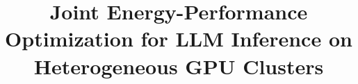 \documentclass[sigconf]{acmart}
\begin{document}
\title{Joint Energy-Performance Optimization for LLM Inference on Heterogeneous GPU Clusters}



\maketitle













\appendix

\end{document}
